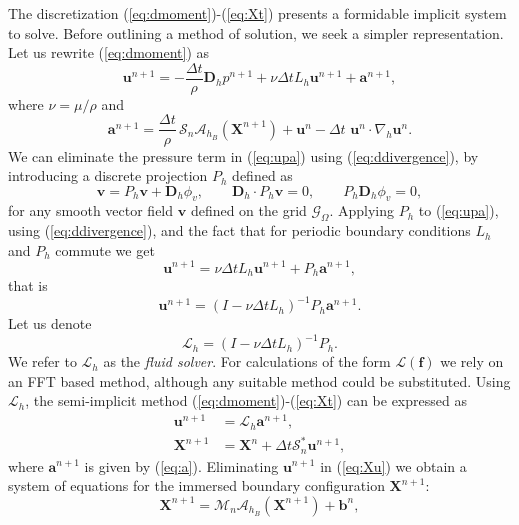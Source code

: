 \documentclass[preprint,12pt]{elsarticle}
\newcommand{\B}[1]{\mathbf{#1}}
\newcommand{\C}[1]{\mathcal{#1}}
\newcommand{\New}[1]{{\color{Red}#1}}
\begin{document}
The discretization (\ref{eq:dmoment})-(\ref{eq:Xt}) presents a formidable implicit system to solve. Before outlining a method of solution,  we seek a simpler representation.
Let us rewrite (\ref{eq:dmoment}) as
\begin{equation}
\B{u}^{n+1}=-\frac{\Delta t}{\rho} \B{D}_h p^{n+1} + \nu\Delta t L_h \B{u}^{n+1} + \B{a}^{n+1},
\label{eq:upa}
\end{equation}
where $\nu=\mu/\rho$ and
\begin{equation}
\B{a}^{n+1}= \frac{\Delta t}{\rho}\, \C{S}_n\C{A}_{h_B}(\B{X}^{n+1})+\B{u}^n-\Delta t \, \, \B{u}^n \cdot \nabla_h \B{u}^n. \label{eq:a}
\end{equation}
We can eliminate the pressure term in (\ref{eq:upa}) using (\ref{eq:ddivergence}), by introducing a discrete projection
$P_h$ defined as 
\begin{equation}
\B{v} = P_h \B{v} + \B{D}_h \phi_v, \qquad \B{D}_h \cdot P_h \B{v} =0, \qquad P_h \B{D}_h \phi_v=0,
\end{equation}
for any smooth vector field $\B{v}$ defined on the grid $\C{G}_{\Omega}$. Applying $P_h$ to (\ref{eq:upa}), using  (\ref{eq:ddivergence}),  and the fact that for periodic boundary conditions $L_h$ and $P_h$ commute we get
\begin{equation}
\B{u}^{n+1}= \nu\Delta t L_h \B{u}^{n+1} + P_h \B{a}^{n+1},
\end{equation}
that is
\begin{equation}
\B{u}^{n+1} = (I -\nu\Delta t L_h)^{-1}  P_h \B{a}^{n+1}.
\end{equation}
Let us denote
\begin{equation}
\C{L}_h = (I -\nu\Delta t L_h)^{-1}  P_h. \label{eq:L_h}
\end{equation}
We refer to $\C{L}_h$ as the \textit{fluid solver}.
\New{For calculations of the form $\C{L}(\B{f})$ we rely on an FFT based method, although any suitable method could be substituted.}
Using $\C{L}_h$,  the semi-implicit method  (\ref{eq:dmoment})-(\ref{eq:Xt})  can be expressed as
\begin{align}
\B{u}^{n+1} &= \C{L}_h \B{a}^{n+1}, \label{eq:uL} \\
\B{X}^{n+1}&=\B{X}^n +\Delta t\C{S}^*_n\B{u}^{n+1}, \label{eq:Xu}
\end{align}
where $ \B{a}^{n+1}$ is given by (\ref{eq:a}). Eliminating $\B{u}^{n+1}$ in (\ref{eq:Xu}) we obtain  a system of equations for the immersed boundary configuration $\B{X}^{n+1}$:
\begin{equation}
\B{X}^{n+1} = \C{M}_n\C{A}_{h_B} (\B{X}^{n+1}) + \B{b}^n, \label{eq:Xnl}
\end{equation}
\end{document}
